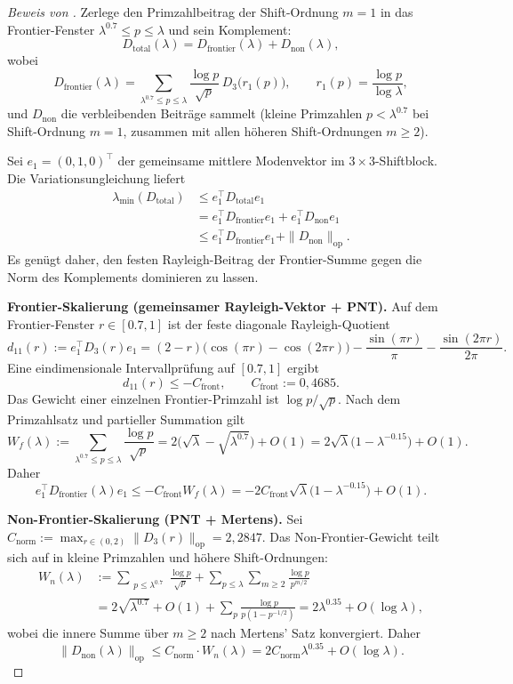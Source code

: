 ﻿\documentclass[12pt,a4paper]{article}
\theoremstyle{definition}
\theoremstyle{remark}
\begin{document}
\begin{proof}[Beweis von ]
Zerlege den Primzahlbeitrag der Shift-Ordnung $m=1$ in das Frontier-Fenster $\lambda^{0.7}\leq p\leq\lambda$ und sein Komplement:
\[
D_{\mathrm{total}}(\lambda) = D_{\mathrm{frontier}}(\lambda) + D_{\mathrm{non}}(\lambda),
\]
wobei
\[
D_{\mathrm{frontier}}(\lambda) = \sum_{\lambda^{0.7} \leq p \leq \lambda} \frac{\log p}{\sqrt{p}}\,D_3\bigl(r_1(p)\bigr), \qquad r_1(p) = \frac{\log p}{\log \lambda},
\]
und $D_{\mathrm{non}}$ die verbleibenden Beiträge sammelt (kleine Primzahlen $p<\lambda^{0.7}$ bei Shift-Ordnung $m=1$, zusammen mit allen höheren Shift-Ordnungen $m \geq 2$).

Sei $e_1=(0,1,0)^\top$ der gemeinsame mittlere Modenvektor im $3\times3$-Shiftblock. Die Variationsungleichung liefert
\begin{align}
\lambda_{\min}(D_{\mathrm{total}}) &\leq e_1^\top D_{\mathrm{total}} e_1 \nonumber \\
 &= e_1^\top D_{\mathrm{frontier}} e_1 + e_1^\top D_{\mathrm{non}} e_1 \nonumber \\
 &\leq e_1^\top D_{\mathrm{frontier}} e_1 + \|D_{\mathrm{non}}\|_{\mathrm{op}}.
 \label{eq:direct-bound}
\end{align}
Es genügt daher, den festen Rayleigh-Beitrag der Frontier-Summe gegen die Norm des Komplements dominieren zu lassen.

\smallskip
\noindent\textbf{Frontier-Skalierung (gemeinsamer Rayleigh-Vektor + PNT).} Auf dem Frontier-Fenster $r\in[0.7,1]$ ist der feste diagonale Rayleigh-Quotient
\[
d_{11}(r) := e_1^\top D_3(r)e_1
 = (2-r)\bigl(\cos(\pi r)-\cos(2\pi r)\bigr)
   - \frac{\sin(\pi r)}{\pi}
   - \frac{\sin(2\pi r)}{2\pi}.
\]
Eine eindimensionale Intervallprüfung auf $[0.7,1]$ ergibt
\[
d_{11}(r) \leq -C_{\mathrm{front}}, \qquad C_{\mathrm{front}}:=0{,}4685.
\]
Das Gewicht einer einzelnen Frontier-Primzahl ist $\log p / \sqrt{p}$. Nach dem Primzahlsatz und partieller Summation gilt
\[
W_f(\lambda) := \sum_{\lambda^{0.7} \leq p \leq \lambda} \frac{\log p}{\sqrt{p}} = 2\bigl(\sqrt{\lambda} - \sqrt{\lambda^{0.7}}\bigr) + O(1) = 2\sqrt{\lambda}\bigl(1 - \lambda^{-0.15}\bigr) + O(1).
\]
Daher
\[
e_1^\top D_{\mathrm{frontier}}(\lambda)e_1 \leq -C_{\mathrm{front}} W_f(\lambda)
= -2 C_{\mathrm{front}}\sqrt{\lambda}\bigl(1-\lambda^{-0.15}\bigr)+O(1).
\]

\smallskip
\noindent\textbf{Non-Frontier-Skalierung (PNT + Mertens).} Sei $C_{\mathrm{norm}} := \max_{r \in (0, 2)} \|D_3(r)\|_{\mathrm{op}} = 2{,}2847$. Das Non-Frontier-Gewicht teilt sich auf in kleine Primzahlen und höhere Shift-Ordnungen:
\begin{align*}
W_n(\lambda) &:= \sum_{\substack{p \leq \lambda^{0.7}}} \frac{\log p}{\sqrt{p}} + \sum_{p \leq \lambda} \sum_{m \geq 2} \frac{\log p}{p^{m/2}} \\
 &= 2\sqrt{\lambda^{0.7}} + O(1) + \sum_p \frac{\log p}{p(1 - p^{-1/2})} = 2 \lambda^{0.35} + O(\log \lambda),
\end{align*}
wobei die innere Summe über $m \geq 2$ nach Mertens' Satz konvergiert. Daher
\[
\|D_{\mathrm{non}}(\lambda)\|_{\mathrm{op}} \leq C_{\mathrm{norm}} \cdot W_n(\lambda) = 2 C_{\mathrm{norm}} \lambda^{0.35} + O(\log \lambda).
\]


\end{proof}
\end{document}
